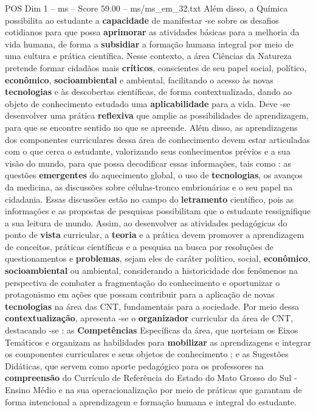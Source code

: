 \begin{textsample}{POS Dim 1 – ms – Score 59.00 – ms/ms\_em\_32.txt}
Além disso, a Química possibilita ao estudante a \textbf{capacidade} de manifestar -se sobre os desafios cotidianos para que possa \textbf{aprimorar} as atividades básicas para a melhoria da vida humana, de forma a \textbf{subsidiar} a formação humana integral por meio de uma cultura e prática científica.
Nesse contexto, a área Ciências da Natureza pretende formar cidadãos mais \textbf{críticos}, conscientes de seu papel social, político, \textbf{econômico}, \textbf{socioambiental} e ambiental, facilitando o acesso às novas \textbf{tecnologias} e às descobertas científicas, de forma contextualizada, dando ao objeto de conhecimento estudado uma \textbf{aplicabilidade} para a vida.
Deve -se desenvolver uma prática \textbf{reflexiva} que amplie as possibilidades de aprendizagem, para que se encontre sentido no que se apreende.
Além disso, as aprendizagens dos componentes curriculares dessa área de conhecimento devem estar articuladas com o que cerca o estudante, valorizando seus conhecimentos prévios e a sua visão do mundo, para que possa decodificar essas informações, tais como : as questões \textbf{emergentes} do aquecimento global, o uso de \textbf{tecnologias}, os avanços da medicina, as discussões sobre células-tronco embrionárias e o seu papel na cidadania.
Essas discussões estão no campo do \textbf{letramento} científico, pois as informações e as propostas de pesquisas possibilitam que o estudante ressignifique a sua leitura de mundo.
Assim, ao desenvolver as atividades pedagógicas do ponto de \textbf{vista} curricular, a \textbf{teoria} e a prática devem promover a aprendizagem de conceitos, práticas científicas e a pesquisa na busca por resoluções de questionamentos e \textbf{problemas}, sejam eles de caráter político, social, \textbf{econômico}, \textbf{socioambiental} ou ambiental, considerando a historicidade dos fenômenos na perspectiva de combater a fragmentação do conhecimento e oportunizar o protagonismo em ações que possam contribuir para a aplicação de novas \textbf{tecnologias} na área das CNT, fundamentais para a sociedade.
Por meio dessa \textbf{contextualização}, apresenta -se o \textbf{organizador} curricular da área de CNT, destacando -se : as \textbf{Competências} Específicas da área, que norteiam os Eixos Temáticos e organizam as habilidades para \textbf{mobilizar} as aprendizagens e integrar os componentes curriculares e seus objetos de conhecimento ; e as Sugestões Didáticas, que servem como aporte pedagógico para os professores na \textbf{compreensão} do Currículo de Referência do Estado do Mato Grosso do Sul - Ensino Médio e na sua operacionalização por meio de práticas que garantam de forma intencional a aprendizagem e formação humana e integral do estudante.


\end{textsample}
